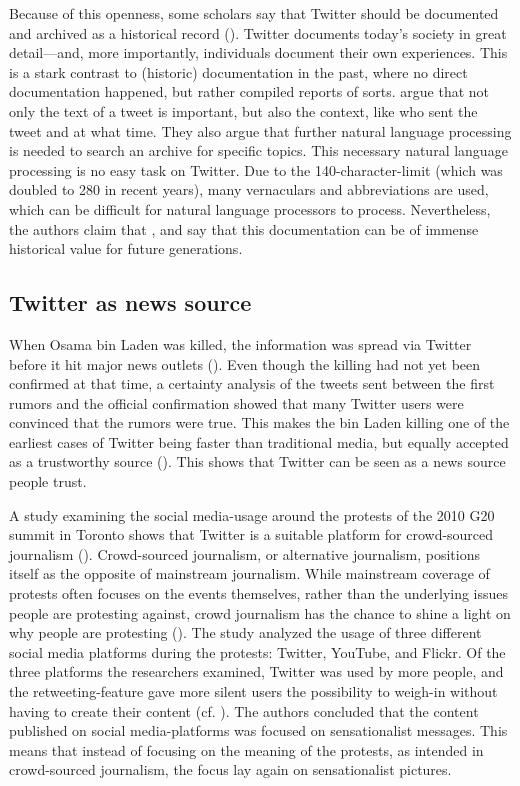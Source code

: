 Because of this openness, some scholars say that Twitter should be documented and archived as a historical record (\cite{risse2014documenting}). Twitter documents today's society in great detail---and, more importantly, individuals document their own experiences. This is a stark contrast to (historic) documentation in the past, where no direct documentation happened, but rather compiled reports of sorts. \citeauthor{risse2014documenting} argue that not only the text of a tweet is important, but also the context, like who sent the tweet and at what time. They also argue that further natural language processing is needed to search an archive for specific topics. This necessary natural language processing is no easy task on Twitter. Due to the 140-character-limit (which was doubled to 280 in recent years), many vernaculars and abbreviations are used, which can be difficult for natural language processors to process. Nevertheless, the authors claim that  \parencite[9]{risse2014documenting}, and say that this documentation can be of immense historical value for future generations.

\subsection{Twitter as news source}  %
When Osama bin Laden was killed, the information was spread via Twitter before it hit major news outlets (\cite{hu2012breaking}). 
Even though the killing had not yet been confirmed at that time, a certainty analysis of the tweets sent between the first rumors and the official confirmation showed that many Twitter users were convinced that the rumors were true. This makes the bin Laden killing one of the earliest cases of Twitter being faster than traditional media, but equally accepted as a trustworthy source (\cite[2751]{hu2012breaking}). This shows that Twitter can be seen as a news source people trust.

A study examining the social media-usage around the protests of the 2010 G20 summit in Toronto shows that Twitter is a suitable platform for crowd-sourced journalism (\cite{poell2012twitter}). Crowd-sourced journalism, or alternative journalism, positions itself as the opposite of mainstream journalism. While mainstream coverage of protests often focuses on the events themselves, rather than the underlying issues people are protesting against, crowd journalism has the chance to shine a light on why people are protesting (\cite[698]{poell2012twitter}). The study analyzed the usage of three different social media platforms during the protests: Twitter, YouTube, and Flickr. Of the three platforms the researchers examined, Twitter was used by more people, and the retweeting-feature gave more silent users the possibility to weigh-in without having to create their content (cf. \cite[709]{poell2012twitter}). The authors concluded that the content published on social media-platforms was focused on sensationalist messages. This means that instead of focusing on the meaning of the protests, as intended in crowd-sourced journalism, the focus lay again on sensationalist pictures.

